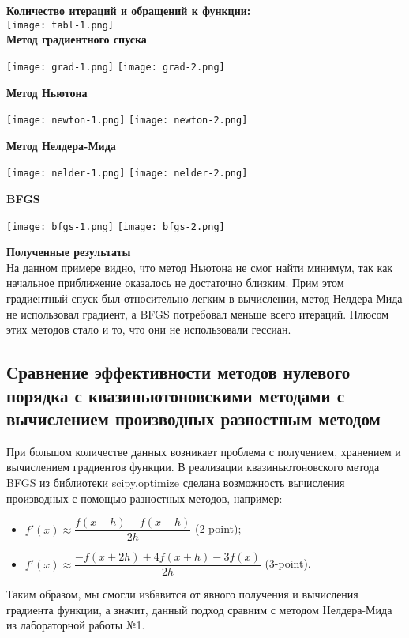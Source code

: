 \documentclass{article}
\begin{document}
\noindent \textbf{Количество итераций и обращений к функции:} \\

\noindent \texttt{[image: tabl-1.png]} \\

\noindent \textbf{Метод градиентного спуска}
\begin{center}
    \texttt{[image: grad-1.png]}
    \texttt{[image: grad-2.png]}
\end{center}

\newpage
\noindent \textbf{Метод Ньютона}
\begin{center}
    \texttt{[image: newton-1.png]}
    \texttt{[image: newton-2.png]}
\end{center}

\noindent \textbf{Метод Нелдера-Мида}
\begin{center}
    \texttt{[image: nelder-1.png]}
    \texttt{[image: nelder-2.png]}
\end{center}
\noindent \textbf{BFGS}
\begin{center}
    \texttt{[image: bfgs-1.png]}
    \texttt{[image: bfgs-2.png]}
\end{center}

\noindent \textbf{Полученные результаты} \\

\noindent На данном примере видно, что метод Ньютона не смог найти минимум, так как начальное приближение оказалось не достаточно близким. Прим этом градиентный спуск был относительно легким в вычислении, метод Нелдера-Мида не использовал градиент, а BFGS потребовал меньше всего итераций. Плюсом этих методов стало и то, что они не использовали гессиан.

\subsection*{Сравнение эффективности методов нулевого порядка с квазиньютоновскими методами с вычислением производных разностным методом}
При большом количестве данных возникает проблема с получением, хранением и вычислением градиентов функции. В реализации квазиньютоновского метода BFGS из библиотеки scipy.optimize сделана возможность вычисления производных с помощью разностных методов, например:
\begin{itemize}
    \item $f'(x) \approx \dfrac{f(x + h) - f(x - h)}{2h}$ (2-point);
    \item $f'(x) \approx \dfrac{-f(x + 2h) + 4f(x + h) - 3f(x)}{2h}$ (3-point).
\end{itemize}
Таким образом, мы смогли избавится от явного получения и вычисления градиента функции, а значит, данный подход сравним с методом Нелдера-Мида из лабораторной работы №1. \\
\end{document}
